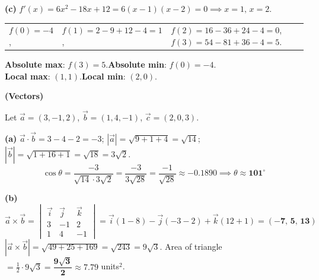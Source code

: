 \documentclass[addpoints]{exam}
\begin{document}
\begin{questions}
\begin{solution}[10cm]
\textbf{(c)} $f'(x) = 6x^2-18x+12 = 6(x-1)(x-2) = 0 \implies x=1,\,x=2$.
\begin{center}
\begin{tabular}{lll}
$f(0)=-4$,&$f(1)=2-9+12-4=1$,&$f(2)=16-36+24-4=0$,\quad $f(3)=54-81+36-4=5$.
\end{tabular}
\end{center}
\textbf{Absolute max}: $f(3)=5$.\quad \textbf{Absolute min}: $f(0)=-4$.\\
\textbf{Local max}: $(1,1)$.\quad \textbf{Local min}: $(2,0)$.
\end{solution}

\question \textbf{(Vectors)}

Let $\vec{a} = (3, -1, 2)$, $\vec{b} = (1, 4, -1)$, $\vec{c} = (2, 0, 3)$.
\begin{solution}[10cm]
\textbf{(a)} $\vec{a}\cdot\vec{b} = 3-4-2 = -3$;\quad
$|\vec{a}| = \sqrt{9+1+4}=\sqrt{14}$;\quad $|\vec{b}|=\sqrt{1+16+1}=\sqrt{18}=3\sqrt{2}$.
\[
\cos\theta = \frac{-3}{\sqrt{14}\cdot3\sqrt{2}} = \frac{-3}{3\sqrt{28}} = \frac{-1}{\sqrt{28}}
\approx -0.1890 \implies \theta \approx \mathbf{101^\circ}
\]

\textbf{(b)}
\[
\vec{a}\times\vec{b} = \begin{vmatrix}\vec{i}&\vec{j}&\vec{k}\\3&-1&2\\1&4&-1\end{vmatrix}
= \vec{i}(1-8)-\vec{j}(-3-2)+\vec{k}(12+1) = \mathbf{(-7,\,5,\,13)}
\]
$|\vec{a}\times\vec{b}| = \sqrt{49+25+169} = \sqrt{243} = 9\sqrt{3}$.
Area of triangle $= \tfrac{1}{2} \cdot 9\sqrt{3} = \mathbf{\dfrac{9\sqrt{3}}{2}} \approx 7.79$ units$^2$.


\end{solution}
\end{questions}
\end{document}
